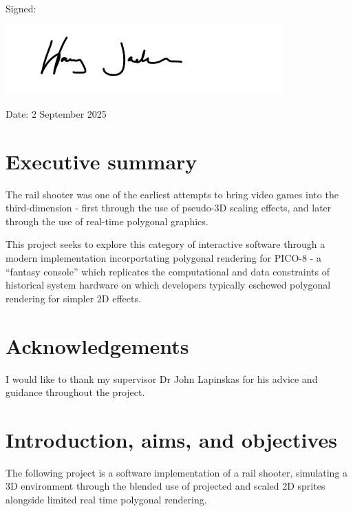 \documentclass[11pt]{article}
\begin{document}
\vspace{0.5cm}

Signed:

\includegraphics[width=0.8\textwidth]{signature}

Date: 2 September 2025

\newpage

\section*{Executive summary}

\vspace{0.5cm}

The rail shooter was one of the earliest attempts to bring video
games into the third-dimension - first through the use of pseudo-3D
scaling effects, and later through the use of real-time polygonal graphics.

This project seeks to explore this category of interactive software through a
modern implementation incorportating polygonal rendering for PICO-8 - a
``fantasy console'' which replicates the computational and data constraints of
historical system hardware on which developers typically eschewed polygonal
rendering for simpler 2D effects.

\vspace{1.5cm}

\section*{Acknowledgements}

\vspace{0.5cm}

I would like to thank my supervisor Dr John Lapinskas for his advice and guidance
throughout the project.

\newpage

\tableofcontents

\newpage

\section{Introduction, aims, and objectives}

The following project is a software implementation of a rail shooter, simulating a 3D 
environment through the blended use of projected and scaled 2D sprites alongside
limited real time polygonal rendering.
\end{document}

